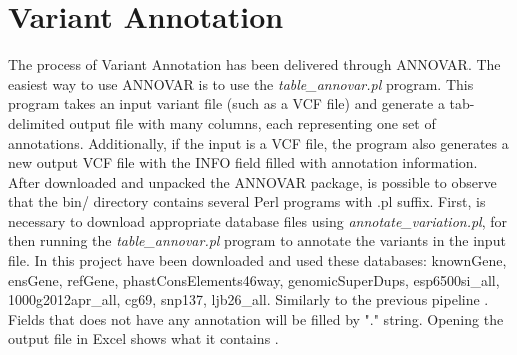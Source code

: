 \section{Variant Annotation}
The process of Variant Annotation has been delivered through ANNOVAR. The easiest way to use ANNOVAR is to use the \textit{table\_annovar.pl} program. This program takes an input variant file (such as a VCF file) and generate a tab-delimited output file with many columns, each representing one set of annotations. Additionally, if the input is a VCF file, the program also generates a new output VCF file with the INFO field filled with annotation information.\newline
After downloaded and unpacked the ANNOVAR package, is possible to observe that the bin/ directory contains several Perl programs with .pl suffix. First, is necessary to download appropriate database files using \textit{annotate\_variation.pl}, for then running the \textit{table\_annovar.pl} program to annotate the variants in the input file. In this project have been downloaded and used these databases: knownGene, ensGene, refGene, phastConsElements46way, genomicSuperDups, esp6500si\_all, 1000g2012apr\_all, cg69, snp137, ljb26\_all. Similarly to the previous pipeline \cite{ScalableEfficientWhole-ExomeProcessing}. \newline
Fields that does not have any annotation will be filled by "." string. Opening the output file in Excel shows what it contains \cite{ANNOVAR_startup}.







